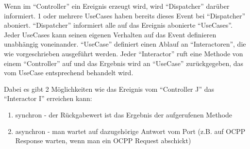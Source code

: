 \documentclass{article}
\begin{document}
    Wenn im ``Controller'' ein Ereignis erzeugt wird, wird ``Dispatcher'' darüber informiert. 1 oder mehrere UseCases haben bereits dieses Event bei ``Dispatcher'' aboniert.
    ``Dispatcher'' informiert alle auf das Ereignis abonierte ``UseCases''. Jeder UseCases kann seinen eigenen Verhalten auf das Event definieren unabhängig voneinander.
    ``UseCase'' definiert einen Ablauf an ``Interactoren'', die wie vorgeschrieben ausgeführt werden. Jeder ``Interactor'' ruft eine Methode von einem ``Controller'' auf 
    und das Ergebnis wird an ``UseCase'' zurückgegeben, das vom UseCase entsprechend behandelt wird.

    \newpage
    Dabei es gibt 2 Möglichkeiten wie das Ereignis vom ``Controller J'' das ``Interactor I'' erreichen kann:
    \begin{enumerate}
        \item synchron - der Rückgabewert ist das Ergebnis der aufgerufenen Methode 
        \item asynchron - man wartet auf dazugehörige Antwort vom Port (z.B. auf OCPP Response warten, wenn man ein OCPP Request abschickt)
    \end{enumerate}
\end{document}
